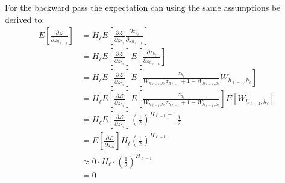 For the backward pass the expectation can using the same assumptions be derived to:
\begin{equation}
\begin{aligned}
E\left[\frac{\partial \mathcal{L}}{\partial z_{h_{\ell-1}}}\right]
&= H_\ell E\left[\frac{\partial \mathcal{L}}{\partial z_{h_\ell}} \frac{\partial z_{h_\ell}}{\partial z_{h_{\ell-1}}}\right] \\
&= H_\ell E\left[\frac{\partial \mathcal{L}}{\partial z_{h_\ell}}\right] E\left[\frac{\partial z_{h_\ell}}{\partial z_{h_{\ell-1}}}\right] \\
&= H_\ell E\left[\frac{\partial \mathcal{L}}{\partial z_{h_\ell}}\right] E\left[\frac{z_{h_\ell}}{W_{h_{\ell-1},h_\ell} z_{h_{\ell-1}} + 1 - W_{h_{\ell-1},h_\ell}} W_{h_{\ell-1},h_\ell}\right] \\
&= H_\ell E\left[\frac{\partial \mathcal{L}}{\partial z_{h_\ell}}\right] E\left[\frac{z_{h_\ell}}{W_{h_{\ell-1},h_\ell} z_{h_{\ell-1}} + 1 - W_{h_{\ell-1},h_\ell}}\right]E\left[W_{h_{\ell-1},h_\ell}\right] \\
&= H_\ell E\left[\frac{\partial \mathcal{L}}{\partial z_{h_\ell}}\right] \left(\frac{1}{2}\right)^{H_{\ell-1}-1} \frac{1}{2} \\
&= E\left[\frac{\partial \mathcal{L}}{\partial z_{h_\ell}}\right] H_\ell \left(\frac{1}{2}\right)^{H_{\ell-1}} \\
&\approx 0 \cdot H_\ell \cdot \left(\frac{1}{2}\right)^{H_{\ell-1}} \\
&= 0
\end{aligned}
\end{equation}


